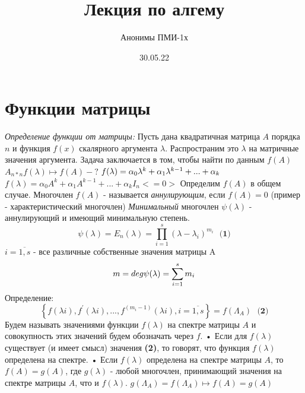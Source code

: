 \documentclass{article}
\title{Лекция по алгему}
\author{Анонимы ПМИ-1х}
\date{30.05.22}
\begin{document}
\maketitle
\large

\section{Функции матрицы}
\textit{Определение функции от матрицы:} \newline
Пусть дана квадратичная матрица \(A\) порядка \(n\) и функция \(f(x)\) скалярного аргумента \(\lambda\). Распространим это \(\lambda\) на матричные значения аргумента.\newline
Задача заключается в том, чтобы найти по данным \(f(A)\)\newline
\(A_{n*n} f(\lambda) \mapsto f(A) - ?\)\newline\newline
\(f(\lambda) = \alpha_{0} \lambda^{k} + \alpha_{1} \lambda^{k-1} + ... + \alpha_{k}\newline\)
\(f(\lambda) = \alpha_{0} A^{k} + \alpha_{1} A^{k-1} + ... + \alpha_{k}I_{n} <= 0>\)\newline\newline
Определим \(f(A)\) в общем случае. \newline
Многочлен \(f(A)\) - называется \textit{аннулирующим}, если \(f(A) = 0\) (пример - характеристический многочлен)\newline
\textit{Минимальный} многочлен \(\psi (\lambda)\)  - аннулирующий и имеющий минимальную степень. \newline
\[\psi (\lambda) = E_{n} (\lambda) = \prod_{i = 1}^{s} (\lambda - \lambda_{i})^{m_{i}} \text{ }\textbf{(1)}\]\(i = \overline{1, s}\) - все различные собственные значения матрицы A\newline
\[\textbf{\(m = deg \psi (\lambda) = \sum_{i=1}^{s} m_{i}\)\newline}\]
Определение:\newline
\[\left\{ f(\lambda{i}), f^{'}(\lambda{i}),..., f^{(m_{i}-1)}(\lambda{i}), i = \overline{1,s}\right\} = f(\Lambda_{A}) \text{ } \textbf{(2)}\]
Будем называть значениями функции \(f(\lambda)\) на спектре матрицы \(A\) и совокупность этих значений будем обозначать через \(f\).\newline
• Если для \(f(\lambda)\) существует (и имеет смысл) значения \textbf{(2)}, то говорят, что функция \(f(\lambda)\) определена на спектре. \newline
• Если \(f(\lambda)\) определена на спектре матрицы \(A\), то \(f(A) = g(A)\), где \(g(\lambda)\) - любой многочлен, принимающий значения на спектре матрицы \(A\), что и \(f(\lambda)\). \newline
\(g(\Lambda_{A}) = f(\Lambda_{A}) \mapsto f(A) = g(A)\)\newline
\end{document}
